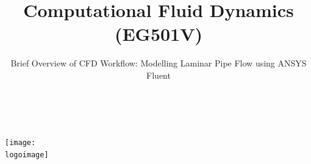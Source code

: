 \documentclass[10pt,compress, unknownkeysallowed]{beamer}
\institute{School of Engineering}
\subtitle{Brief Overview of CFD Workflow: Modelling Laminar Pipe Flow using ANSYS Fluent}
\title{Computational Fluid Dynamics (EG501V)}
\date[]{}
\author[\shortname]{%
  \fullname\\\ttfamily{\emailaddress}
}
\newcommand{\logoimage}{./FigBanner/UoAHorizBanner}
\begin{document}
\begin{frame}
  \titlepage
  \vfill%
  \begin{center}
    \texttt{[image: \\logoimage]}
  \end{center}
\end{frame}






\end{document}
